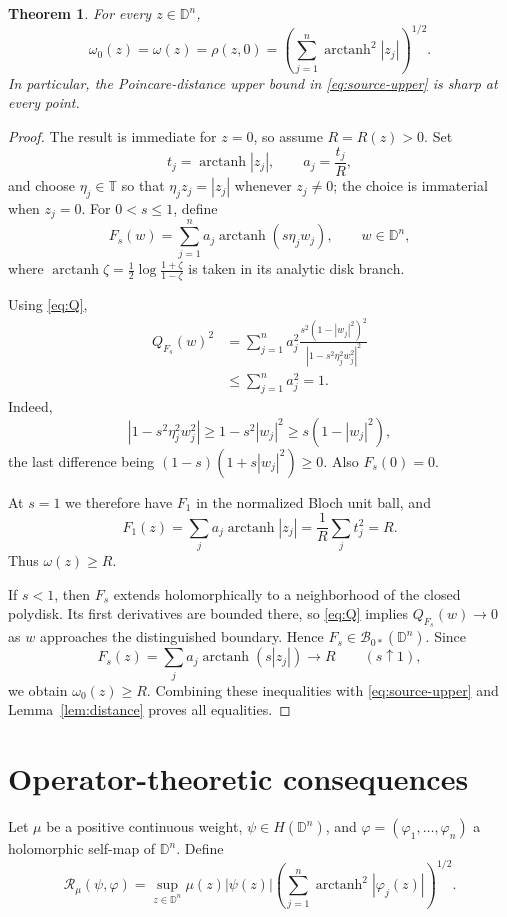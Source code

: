 \documentclass[11pt]{article}
\newtheorem{theorem}{Theorem}
\newcommand{\D}{\mathbb D}
\newcommand{\Bspace}{\mathcal B}
\newcommand{\atanh}{\operatorname{arctanh}}
\begin{document}
\begin{theorem}\label{thm:main}
For every $z\in\D^n$,
\[
 \boxed{\quad
 \omega_0(z)=\omega(z)=\rho(z,0)
 =\left(\sum_{j=1}^n\atanh^2|z_j|\right)^{1/2}.
 \quad}
\]
In particular, the Poincare-distance upper bound in
\eqref{eq:source-upper} is sharp at every point.
\end{theorem}

\begin{proof}
The result is immediate for $z=0$, so assume $R=R(z)>0$.  Set
\[
 t_j=\atanh|z_j|,\qquad a_j=\frac{t_j}{R},
\]
and choose $\eta_j\in\mathbb T$ so that $\eta_jz_j=|z_j|$ whenever
$z_j\neq0$; the choice is immaterial when $z_j=0$.  For $0<s\leq1$, define
\begin{equation}\label{eq:Fs}
 F_s(w)=\sum_{j=1}^n a_j\atanh(s\eta_jw_j),
 \qquad w\in\D^n,
\end{equation}
where $\atanh\zeta=\frac12\log\frac{1+\zeta}{1-\zeta}$ is taken in its
analytic disk branch.

Using \eqref{eq:Q},
\begin{align*}
 Q_{F_s}(w)^2
 &=\sum_{j=1}^na_j^2
 \frac{s^2(1-|w_j|^2)^2}{|1-s^2\eta_j^2w_j^2|^2}\\
 &\leq\sum_{j=1}^na_j^2=1.
\end{align*}
Indeed,
\[
 |1-s^2\eta_j^2w_j^2|
 \geq1-s^2|w_j|^2
 \geq s(1-|w_j|^2),
\]
the last difference being $(1-s)(1+s|w_j|^2)\geq0$.  Also $F_s(0)=0$.

At $s=1$ we therefore have $F_1$ in the normalized Bloch unit ball, and
\[
 F_1(z)=\sum_ja_j\atanh|z_j|
 =\frac1R\sum_jt_j^2=R.
\]
Thus $\omega(z)\geq R$.

If $s<1$, then $F_s$ extends holomorphically to a neighborhood of the closed
polydisk.  Its first derivatives are bounded there, so
\eqref{eq:Q} implies $Q_{F_s}(w)\to0$ as $w$ approaches the distinguished
boundary.  Hence $F_s\in\Bspace_{0*}(\D^n)$.  Since
\[
 F_s(z)=\sum_ja_j\atanh(s|z_j|)\longrightarrow R
 \qquad(s\uparrow1),
\]
we obtain $\omega_0(z)\geq R$.  Combining these inequalities with
\eqref{eq:source-upper} and Lemma~\ref{lem:distance} proves all equalities.
\end{proof}

\section{Operator-theoretic consequences}

Let $\mu$ be a positive continuous weight, $\psi\in H(\D^n)$, and
$\varphi=(\varphi_1,\ldots,\varphi_n)$ a holomorphic self-map of $\D^n$.
Define
\[
 \mathcal R_\mu(\psi,\varphi)
 =\sup_{z\in\D^n}\mu(z)|\psi(z)|
 \left(\sum_{j=1}^n\atanh^2|\varphi_j(z)|\right)^{1/2}.
\]
\end{document}

